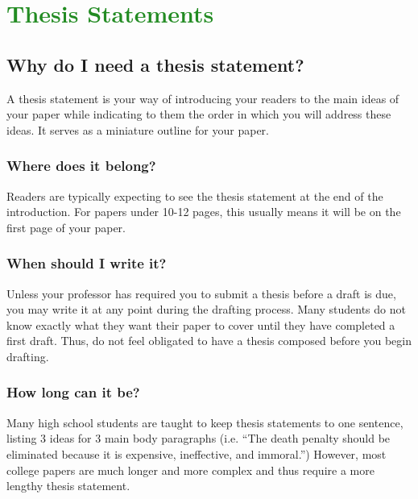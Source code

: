 \documentclass[12pt, hidelinks]{article} %
\begin{document}

\section{\textcolor{ForestGreen}{Thesis Statements}}

\subsection{Why do I need a thesis statement?}

A thesis statement is your way of introducing your readers to the main ideas of your paper while indicating to them the order in which you will address these ideas. It serves as a miniature outline for your paper.

\subsubsection{Where does it belong?}

Readers are typically expecting to see the thesis statement at the end of the introduction. For papers under 10-12 pages, this usually means it will be on the first page of your paper.

\subsubsection{When should I write it?}

Unless your professor has required you to submit a thesis before a draft is due, you may write it at any point during the drafting process. Many students do not know exactly what they want their paper to cover until they have completed a first draft. Thus, do not feel obligated to have a thesis composed before you begin drafting.

\subsubsection{How long can it be?}

Many high school students are taught to keep thesis statements to one sentence, listing 3 ideas for 3 main body paragraphs (i.e. ``The death penalty should be eliminated because it is expensive, ineffective, and immoral.'') However, most college papers are much longer and more complex and thus require a more lengthy thesis statement.
\end{document}
